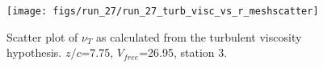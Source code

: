 \begin{figure}[H]
\centering
\texttt{[image: figs/run\_27/run\_27\_turb\_visc\_vs\_r\_meshscatter]}
\caption{Scatter plot of $\nu_T$ as calculated from the turbulent viscosity hypothesis. $z/c$=7.75, $V_{free}$=26.95, station 3.}
\label{fig:run_27_turb_visc_vs_r_meshscatter}
\end{figure}


